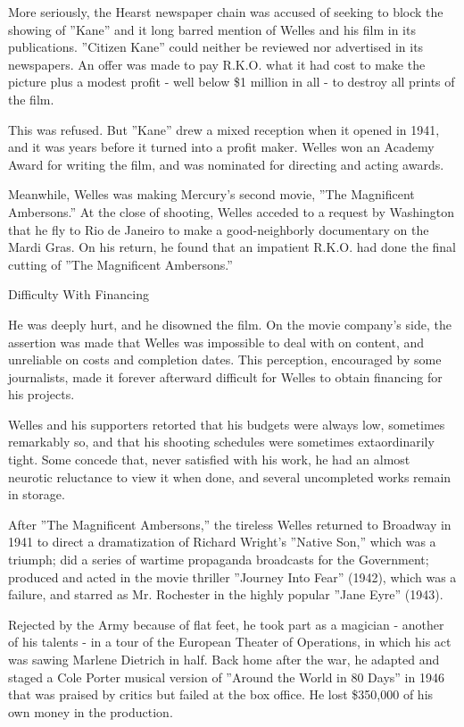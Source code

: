 More seriously, the Hearst newspaper chain was accused of seeking to
block the showing of ''Kane'' and it long barred mention of Welles and
his film in its publications. ''Citizen Kane'' could neither be reviewed
nor advertised in its newspapers. An offer was made to pay R.K.O. what
it had cost to make the picture plus a modest profit - well below \$1
million in all - to destroy all prints of the film.

This was refused. But ''Kane'' drew a mixed reception when it opened in
1941, and it was years before it turned into a profit maker. Welles won
an Academy Award for writing the film, and was nominated for directing
and acting awards.

Meanwhile, Welles was making Mercury's second movie, ''The Magnificent
Ambersons.'' At the close of shooting, Welles acceded to a request by
Washington that he fly to Rio de Janeiro to make a good-neighborly
documentary on the Mardi Gras. On his return, he found that an impatient
R.K.O. had done the final cutting of ''The Magnificent Ambersons.''

Difficulty With Financing

He was deeply hurt, and he disowned the film. On the movie company's
side, the assertion was made that Welles was impossible to deal with on
content, and unreliable on costs and completion dates. This perception,
encouraged by some journalists, made it forever afterward difficult for
Welles to obtain financing for his projects.

Welles and his supporters retorted that his budgets were always low,
sometimes remarkably so, and that his shooting schedules were sometimes
extaordinarily tight. Some concede that, never satisfied with his work,
he had an almost neurotic reluctance to view it when done, and several
uncompleted works remain in storage.

After ''The Magnificent Ambersons,'' the tireless Welles returned to
Broadway in 1941 to direct a dramatization of Richard Wright's ''Native
Son,'' which was a triumph; did a series of wartime propaganda
broadcasts for the Government; produced and acted in the movie thriller
''Journey Into Fear'' (1942), which was a failure, and starred as Mr.
Rochester in the highly popular ''Jane Eyre'' (1943).

Rejected by the Army because of flat feet, he took part as a magician -
another of his talents - in a tour of the European Theater of
Operations, in which his act was sawing Marlene Dietrich in half. Back
home after the war, he adapted and staged a Cole Porter musical version
of ''Around the World in 80 Days'' in 1946 that was praised by critics
but failed at the box office. He lost \$350,000 of his own money in the
production.

